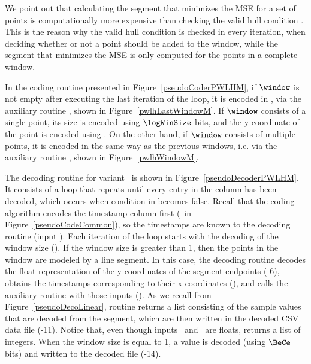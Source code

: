 


We point out that calculating the segment that minimizes the MSE for a set of points is computationally more expensive than checking the valid hull condition \cite{AnEva2013}. This is the reason why the valid hull condition is checked in every iteration, when deciding whether or not a point should be added to the window, while the segment that minimizes the MSE is only computed for the points in a complete window.


In the coding routine presented in Figure~\ref{pseudoCoderPWLHM}, if $\window$ is not empty after executing the last iteration of the loop, it is encoded in , via the auxiliary routine \EncodeLastWindowPWLH, shown in Figure~\ref{pwlhLastWindowM}. If $\window$ consists of a single point, its size is encoded using $\logWinSize$ bits, and the y-coordinate of the point is encoded using \tobitexp. On the other hand, if $\window$ consists of multiple points, it is encoded in the same way as the previous windows, i.e. via the auxiliary routine \EncodeWindow, shown in Figure~\ref{pwlhWindowM}.





\vspace{+5pt}
The decoding routine for variant \maskalgo\ is shown in Figure~\ref{pseudoDecoderPWLHM}. It consists of a loop that repeats until every entry in the column has been decoded, which occurs when condition in  becomes false. Recall that the coding algorithm encodes the timestamp column first (\Line \gapLine\ in Figure~\ref{pseudoCodeCommon}), so the timestamps are known to the decoding routine (input \tscol). Each iteration of the loop starts with the decoding of the window size (). If the window size is greater than 1, then the points in the window are modeled by a line segment. In this case, the decoding routine decodes the float representation of the y-coordinates of the segment endpoints (-6), obtains the timestamps corresponding to their x-coordinates (), and calls the auxiliary routine \decodeSegment with those inputs (). As we recall from Figure~\ref{pseudoDecoLinear}, routine \decodeSegment returns a list consisting of the sample values that are decoded from the segment, which are then written in the decoded CSV data file (-11). Notice that, even though inputs \sO\ and \sN\ are floats, \decodeSegment returns a list of integers. When the window size is equal to 1, a value is decoded (using $\BeCe$ bits) and written to the decoded file (-14).


